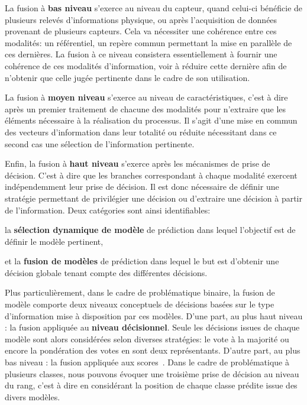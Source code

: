 La fusion à \textbf{bas niveau} s'exerce au niveau du capteur, quand celui-ci bénéficie de plusieurs relevés d'informations physique, ou après l'acquisition de données provenant de plusieurs capteurs. Cela va nécessiter une cohérence entre ces modalités: un référentiel, un repère commun permettant la mise en parallèle de ces dernières. La fusion à ce niveau consistera essentiellement à fournir une cohérence de ces modalités d'information, voir à réduire cette dernière afin de n'obtenir que celle jugée pertinente dans le cadre de son utilisation.\par

La fusion à \textbf{moyen niveau} s'exerce au niveau de caractéristiques, c'est à dire après un premier traitement de chacune des modalités pour n'extraire que les éléments nécessaire à la réalisation du processus. Il s'agit d'une mise en commun des vecteurs d'information dans leur totalité ou réduite nécessitant dans ce second cas une sélection de l'information pertinente.\par

Enfin, la fusion à \textbf{haut niveau} s'exerce après les mécanismes de prise de décision. C'est à dire que les branches correspondant à chaque modalité exercent indépendemment leur prise de décision. Il est donc nécessaire de définir une stratégie permettant de privilégier une décision ou d'extraire une décision à partir de l'information. Deux catégories sont ainsi identifiables: 
\begin{inlinerate}
\item la \textbf{sélection dynamique de modèle} de prédiction dans lequel l'objectif est de définir le modèle pertinent,
\item et la \textbf{fusion de modèles} de prédiction dans lequel le but est d'obtenir une décision globale tenant compte des différentes décisions.
\end{inlinerate}\par

Plus particulièrement, dans le cadre de problématique binaire, la fusion de modèle comporte deux niveaux conceptuels de décisions basées sur le type d'information mise à disposition par ces modèles. D'une part, au plus haut niveau : la fusion appliquée au \textbf{niveau décisionnel}. Seule les décisions issues de chaque modèle sont alors considérées selon diverses stratégies: le vote à la majorité ou encore la pondération des votes en sont deux représentants. D'autre part, au plus bas niveau : la fusion appliquée aux scores~\cite{Kittler1998}. Dans le cadre de problématique à plusieurs classes, nous pouvons évoquer une troisième prise de décision au niveau du rang, c'est à dire en considérant la position de chaque classe prédite issue des divers modèles.\par


